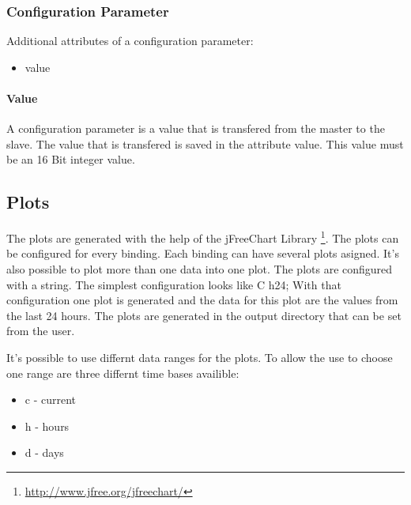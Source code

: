 \subsubsection{Configuration Parameter} %
\label{ssub:configuration_parameter}
Additional attributes of a configuration parameter:
\begin{itemize}
    \item value
\end{itemize}

\paragraph{Value} %
\label{par:value}
A configuration parameter is a value that is transfered from the master to the slave. The value that is transfered is saved in the attribute value. This value must be an 16 Bit integer value.


\subsection{Plots} %
\label{sub:plots}
The plots are generated with the help of the jFreeChart Library \footnote{\url{http://www.jfree.org/jfreechart/}}.
The plots can be configured for every binding. Each binding can have several plots asigned. It's also possible to plot more than one data into one plot. The plots are configured with a string. The simplest configuration looks like {C h24;} With that configuration one plot is generated and the data for this plot are the values from the last 24 hours. The plots are generated in the output directory that can be set from the user.

It's possible to use differnt data ranges for the plots. To allow the use to choose one range are three differnt time bases availible:
\begin{itemize}
	\item c - current
	\item h - hours
	\item d - days
\end{itemize}

